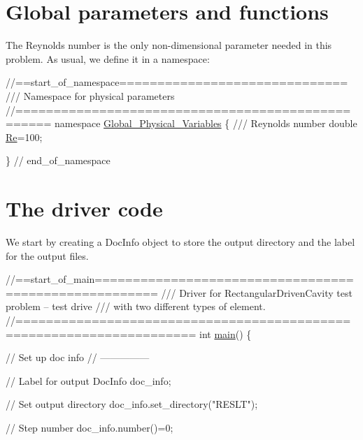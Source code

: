  

\hypertarget{index_namespace}{}\section{Global parameters and functions}\label{index_namespace}
The Reynolds number is the only non-\/dimensional parameter needed in this problem. As usual, we define it in a namespace\+:

 
\begin{DoxyCodeInclude}
\textcolor{comment}{//==start\_of\_namespace==============================}
\textcolor{comment}{/// Namespace for physical parameters}
\textcolor{comment}{}\textcolor{comment}{//==================================================}
\textcolor{keyword}{namespace }\hyperlink{namespaceGlobal__Physical__Variables}{Global\_Physical\_Variables}
\{
\textcolor{comment}{}
\textcolor{comment}{ /// Reynolds number}
\textcolor{comment}{} \textcolor{keywordtype}{double} \hyperlink{namespaceGlobal__Physical__Variables_ab814e627d2eb5bc50318879d19ab16b9}{Re}=100;

\} \textcolor{comment}{// end\_of\_namespace}

\end{DoxyCodeInclude}




 

\hypertarget{index_main}{}\section{The driver code}\label{index_main}
We start by creating a {\ttfamily Doc\+Info} object to store the output directory and the label for the output files.


\begin{DoxyCodeInclude}
\textcolor{comment}{//==start\_of\_main======================================================}
\textcolor{comment}{/// Driver for RectangularDrivenCavity test problem -- test drive}
\textcolor{comment}{}\textcolor{comment}{/// with two different types of element.}
\textcolor{comment}{}\textcolor{comment}{//=====================================================================}
\textcolor{keywordtype}{int} \hyperlink{driven__cavity_8cc_ae66f6b31b5ad750f1fe042a706a4e3d4}{main}()
\{

 \textcolor{comment}{// Set up doc info}
 \textcolor{comment}{// ---------------}

 \textcolor{comment}{// Label for output}
 DocInfo doc\_info;
 
 \textcolor{comment}{// Set output directory}
 doc\_info.set\_directory(\textcolor{stringliteral}{"RESLT"});
 
 \textcolor{comment}{// Step number}
 doc\_info.number()=0;

\end{DoxyCodeInclude}


